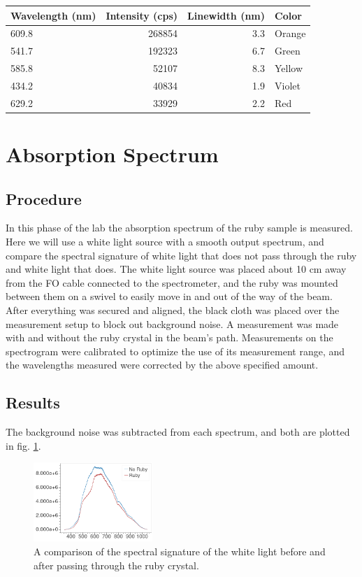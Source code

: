 \documentclass[aps,prl,reprint]{revtex4-2}
\begin{document}
\begin{table}[h]
\begin{tabular}{lrrl}
\toprule
Wavelength (nm) &  Intensity (cps) &  Linewidth (nm) &   Color \\
\hline
609.8 &     268854 &    3.3 &  Orange \\
541.7 &     192323 &    6.7 &   Green \\
585.8 &      52107 &    8.3 &  Yellow \\
434.2 &      40834 &    1.9 &  Violet \\
629.2 &      33929 &    2.2 &     Red \\\hline
\hline
\end{tabular}
\label{widths}
\end{table}

\section{Absorption Spectrum}

\subsection{Procedure}
In this phase of the lab the absorption spectrum of the ruby sample is measured. Here
we will use a white light source with a smooth output spectrum, and compare the
spectral signature of white light that does not pass through the ruby and white light
that does. The white light source was placed about 10 cm away from the FO cable 
connected to the spectrometer, and the ruby was mounted between them on a swivel to 
easily move in and out of the way of the beam. After everything was secured and aligned,
the black cloth was placed over the measurement setup to block out background noise. 
A measurement was made with and without the ruby crystal in the beam's path.
Measurements on the spectrogram were calibrated to optimize the use of its measurement
range, and the wavelengths measured were corrected by the above specified amount.


\subsection{Results}
The background noise was subtracted from each spectrum, and both are plotted in fig. \ref{ruby-no-ruby}.

\begin{figure}[h]
	\includegraphics[width=0.4\textwidth]{../Images/l3_B_a.png}
	\caption{\label{ruby-no-ruby} A comparison of the spectral signature of the 
	white light before and after passing through the ruby crystal.}
\end{figure}
\end{document}
